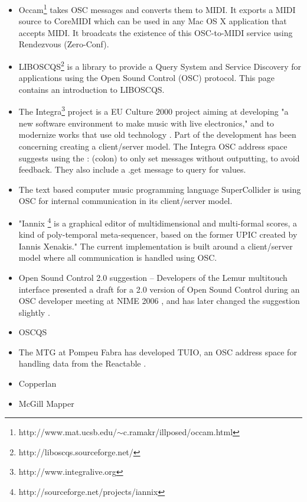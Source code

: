 \documentclass{sig-alternate}
\begin{document}
\begin{itemize}
	\item 	Occam\footnote{http://www.mat.ucsb.edu/$\sim$c.ramakr/illposed/occam.html} takes OSC messages and converts 
		them to 	MIDI. It exports a MIDI source to CoreMIDI which can be used in any Mac OS X application that 
		accepts MIDI. It broadcats the existence of this OSC-to-MIDI service using Rendezvous (Zero-Conf).
	\item 	LIBOSCQS\footnote{http://liboscqs.sourceforge.net/} is a library to provide a Query System and 
		Service Discovery for applications using the Open Sound Control (OSC) protocol\cite{Schmeder:2004oscqs}. 
		This page contains an introduction to LIBOSCQS.
	\item 	The Integra\footnote{http://www.integralive.org} project is a EU Culture 2000 project aiming at 
		developing "a new software environment to make music with live electronics," and to modernize works 
		that use old technology \cite{Bullock:2007}. Part of the development has been concerning creating a 
		client/server model.  The Integra OSC address space suggests using the : (colon) to only set 
		messages without outputting, to avoid feedback. They also include a .get message to query for values. 
	\item	The text based computer music programming language SuperCollider is using OSC for internal 
		communication in its client/server model. 
	\item 	"Iannix \footnote{http://sourceforge.net/projects/iannix} is a graphical editor of 
		multidimensional and multi-formal scores, a kind of poly-temporal meta-sequencer, based on the former 
		UPIC created by Iannis Xenakis." The current implementation is built around a client/server model 
		where all communication is handled using OSC. \cite{Coduys:2004}
	\item	Open Sound Control 2.0 suggestion -- Developers of the Lemur multitouch interface presented a draft 
		for a 2.0 version of Open Sound Control during an OSC developer meeting at 
		NIME 2006 \cite{Jazzmutant:2006}, and has later changed the suggestion slightly \cite{Jazzmutant:2007}. 
	\item   OSCQS \cite{Habets:2005}
	\item	The MTG at Pompeu Fabra has developed TUIO, an OSC address space for handling data from 
		the Reactable \cite{Kaltenbrunner:2005}.
	\item    Copperlan
	\item   McGill Mapper \cite{Malloch:2007}

\end{itemize}
\end{document}
